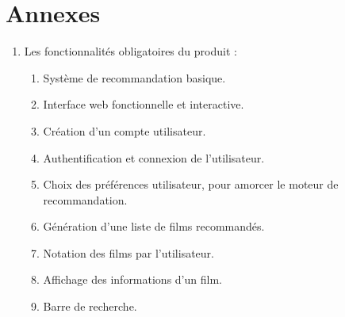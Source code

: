 \documentclass[a4paper,12pt]{report}
\begin{document}
\chapter{Annexes}
\begin{enumerate}[label=A.\arabic*, leftmargin=1.7cm]
    \item Les fonctionnalités obligatoires du produit :
    \begin{enumerate}[label=FR-0\arabic*, leftmargin=0.8cm]
        \item Système de recommandation basique.
        \item Interface web fonctionnelle et interactive.
        \item Création d'un compte utilisateur.
        \item Authentification et connexion de l'utilisateur.
        \item Choix des préférences utilisateur, pour amorcer le moteur de recommandation.
        \item Génération d'une liste de films recommandés. 
        \item Notation des films par l'utilisateur.
        \item Affichage des informations d'un film.
        \item Barre de recherche.
    \end{enumerate}
\end{enumerate}
\end{document}
